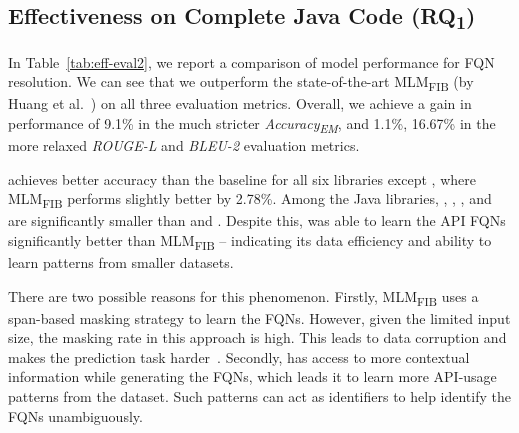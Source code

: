\subsection{Effectiveness on Complete Java Code (RQ\textsubscript{1})}
\label{sec:rq1}

In Table~\ref{tab:eff-eval2}, we report a comparison of model performance for FQN resolution. We can see that we outperform the state-of-the-art MLM\textsubscript{FIB} (by Huang et al.~\cite{prompt-ase22}) on all three evaluation metrics. Overall, we achieve a gain in performance of 9.1\% in the much stricter \textit{Accuracy\textsubscript{EM}}, and 1.1\%, 16.67\% in the more relaxed \textit{ROUGE-L} and \textit{BLEU-2} evaluation metrics.

\tool achieves better accuracy than the baseline for all six libraries except , where MLM\textsubscript{FIB} performs slightly better by 2.78\%. Among the Java libraries, , , , and  are significantly smaller than  and . Despite this, \tool was able to learn the API FQNs significantly better than MLM\textsubscript{FIB} -- indicating its data efficiency and ability to learn patterns from smaller datasets. 

There are two possible reasons for this phenomenon. Firstly, MLM\textsubscript{FIB} uses a span-based masking strategy to learn the FQNs. However, given the limited input size, the masking rate in this approach is high. This leads to data corruption and makes the prediction task harder~\cite{wettig-etal-2023-mask}. Secondly, \tool has access to more contextual information while generating the FQNs, which leads it to learn more API-usage patterns from the dataset. Such patterns can act as identifiers to help \tool identify the FQNs unambiguously.



